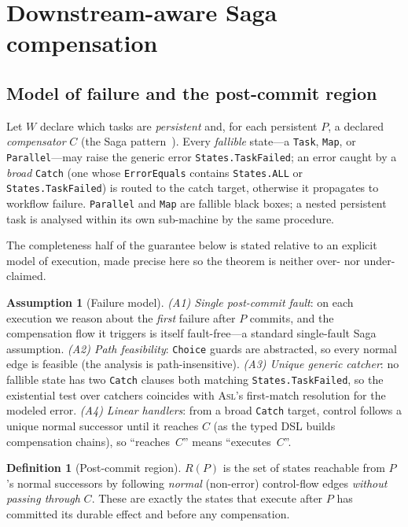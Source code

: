 \documentclass[11pt]{article}
\newcommand{\asl}{\textsc{Asl}}
\theoremstyle{plain}
\theoremstyle{definition}
\newtheorem{definition}{Definition}
\newtheorem{assumption}{Assumption}
\theoremstyle{remark}
\begin{document}
\section{Downstream-aware Saga compensation}
\label{sec:tr:saga}

\subsection{Model of failure and the post-commit region}

Let $W$ declare which tasks are \emph{persistent} and, for each persistent $P$, a declared
\emph{compensator} $C$ (the Saga pattern~\cite{garciaMolina1987}). Every \emph{fallible} state---a \texttt{Task}, \texttt{Map}, or
\texttt{Parallel}---may raise the generic error \texttt{States.TaskFailed}; an error caught by a
\emph{broad} \texttt{Catch} (one whose \texttt{ErrorEquals} contains \texttt{States.ALL} or
\texttt{States.TaskFailed}) is routed to the catch target, otherwise it propagates to workflow
failure. \texttt{Parallel} and \texttt{Map} are fallible black boxes; a nested persistent task is
analysed within its own sub-machine by the same procedure.

The completeness half of the guarantee below is stated relative to an explicit model of
execution, made precise here so the theorem is neither over- nor under-claimed.

\begin{assumption}[Failure model]\label{asm:saga-model}
\emph{(A1) Single post-commit fault}: on each execution we reason about the \emph{first} failure
after $P$ commits, and the compensation flow it triggers is itself fault-free---a standard
single-fault Saga assumption. \emph{(A2) Path feasibility}: \texttt{Choice} guards are abstracted,
so every normal edge is feasible (the analysis is path-insensitive). \emph{(A3) Unique generic
catcher}: no fallible state has two \texttt{Catch} clauses both matching \texttt{States.TaskFailed},
so the existential test over catchers coincides with \asl's first-match resolution for the modeled
error. \emph{(A4) Linear handlers}: from a broad \texttt{Catch} target, control follows a unique
normal successor until it reaches $C$ (as the typed DSL builds compensation chains), so
``reaches~$C$'' means ``executes~$C$''.
\end{assumption}

\begin{definition}[Post-commit region]
$R(P)$ is the set of states reachable from $P$'s normal successors by following \emph{normal}
(non-error) control-flow edges \emph{without passing through} $C$. These are exactly the states
that execute after $P$ has committed its durable effect and before any compensation.
\end{definition}
\end{document}
